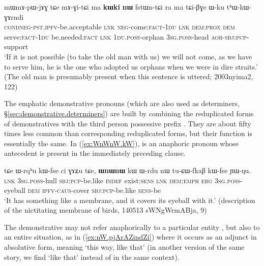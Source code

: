 \begin{exe}
\ex \label{ex:kWki.nW.ftsWntCi}
 \gll mɯ\redp{}mɤ-pɯ-jɤɣ tɕe mɤ-ɣi-tɕi ma \textbf{kɯki} \textbf{nɯ} fstɯn-tɕi ra ma tɕi-βɣe ɯ-ku tʰɯ-kɯ-ɣɤrndi  \\
\textsc{cond}\redp{}\textsc{neg}-\textsc{pst}.\textsc{ipfv}-be.acceptable \textsc{lnk} \textsc{neg}-come:\textsc{fact}-\textsc{1du} \textsc{lnk} \textsc{dem}:\textsc{prox} \textsc{dem} serve:\textsc{fact}-\textsc{1du} be.needed:\textsc{fact} \textsc{lnk} \textsc{1du}.\textsc{poss}-orphan \textsc{3sg}.\textsc{poss}-head \textsc{aor}-\textsc{sbj}:\textsc{pcp}-support \\
\glt `If it is not possible (to take the old man with us) we will not come, as we have to serve him, he is the one who adopted us orphans when we were in dire straits.' (The old man is presumably present when this sentence is uttered; 2003nyima2, 122)
\end{exe}

The emphatic demonstrative pronouns (which are also used as determiners, §\ref{sec:demonstrative.determiners}) are built by combining the reduplicated forms of demonstratives with the third person possessive prefix . They are about fifty times less common than corresponding reduplicated forms, but their function is essentially the same. In (\ref{ex:WnWnW.kW}),  is an anaphoric pronoun whose antecedent is present in the immediately preceding clause.

\begin{exe}
\ex \label{ex:WnWnW.kW}
 \gll
tɕe ɯ-rqʰu kɯ-fse ci ɣɤʑu tɕe, \textbf{ɯnɯnɯ} kɯ ɯ-rdu nɯ tu-ɕɯ-fkaβ kɯ-fse ɲɯ-ŋu. \\
\textsc{lnk} \textsc{3sg}.\textsc{poss}-hull \textsc{sbj}:\textsc{pcp}-be.like \textsc{indef}  exist:\textsc{sens} \textsc{lnk} \textsc{dem}:\textsc{emph} \textsc{erg} \textsc{3sg}.\textsc{poss}-eyeball \textsc{dem} \textsc{ipfv}-\textsc{caus}-cover  \textsc{sbj}:\textsc{pcp}-be.like \textsc{sens}-be \\
\glt `It has something like a membrane, and it covers its eyeball with it.' (description of the nictitating membrane of birds, 140513 sWNgWrmABja, 9)
\end{exe}

The demonstrative  may not refer anaphorically to a particular entity , but also to an entire situation, as in (\ref{ex:nW.pjArAZindZi}) where it occurs as an adjunct in absolutive form, meaning `this way, like that' (in another version of the same story, we find  `like that' instead of  in the same context).

